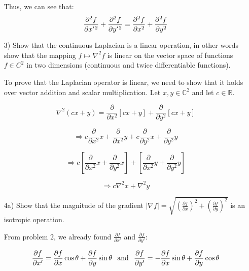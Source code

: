 \documentclass{article}
\begin{document}
\begin{enumerate}
Thus, we can see that:
$$ \frac{\partial^2 f}{\partial x' \hspace{.2mm} ^2} + \frac{\partial^2 f}{\partial y' \hspace{.2mm} ^2} =  \frac{\partial^2 f}{\partial x^2} + \frac{\partial^2 f}{\partial y ^2}$$

\item[3)] Show that the continuous Laplacian is a linear operation, in other words show that the mapping $f\mapsto \nabla^2f$ is linear on the vector space 
of functions $f\in C^2$ in two dimensions (continuous and twice differentiable functions). 

To prove that the Laplacian operator is linear, we need to show that it holds over vector addition and scalar multiplication. Let $x,y \in \mathbb{C} ^ 2$ and let $c \in \mathbb{R}$.

\begin{equation}
\nabla^2 (cx + y)  = \frac{\partial}{\partial x^2} \left[ cx + y \right] + \frac{\partial}{\partial y^2} \left[ cx + y \right]
\end{equation}

\begin{equation}
\Rightarrow c \frac{\partial}{\partial x^2} x + \frac{\partial}{\partial x^2} y + c \frac{\partial}{\partial y^2} x + \frac{\partial}{\partial y^2} y
\end{equation}

\begin{equation}
\Rightarrow c \left[ \frac{\partial}{\partial x^2} x + \frac{\partial}{\partial y^2} x \right] + \left[ \frac{\partial}{\partial x^2} y + \frac{\partial}{\partial y^2} y \right]
\end{equation}

\begin{equation}
\Rightarrow c \nabla^2 x + \nabla^2 y
\end{equation}

\item[4a)] Show that the magnitude of the gradient $|\nabla f|=\sqrt{(\frac{\partial f}{\partial x})^2+(\frac{\partial f}{\partial y})^2}$ is an isotropic operation. 

From problem 2, we already found {\Large$\frac{\partial f}{\partial x'}$} and {\Large$\frac{\partial f}{\partial y'}$}:

\begin{equation}
\frac{\partial f}{\partial x'} = \frac{\partial f}{\partial x} \cos\theta  + \frac{\partial f}{\partial y} \sin\theta \hspace{0.1in} \text{and} \hspace{0.1in} \frac{\partial f}{\partial y'}= -\frac{\partial f}{\partial x} \sin\theta + \frac{\partial f}{\partial y}\cos\theta 
\end{equation}


\end{enumerate}
\end{document}
